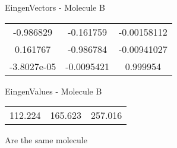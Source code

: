 \begin{multicols}{2}
\begin{center}
\vtab
 EingenVectors - Molecule B     \\
\vtab
\begin{tabular}{|c c c|}
-0.986829	 & 	-0.161759	 & 	-0.00158112	 \\
0.161767	 & 	-0.986784	 & 	-0.00941027	 \\
-3.8027e-05	 & 	-0.0095421	 & 	0.999954
\end{tabular}

\vtab
 EingenValues - Molecule B     \\
\vtab
\begin{tabular}{|c c c|}
112.224	 & 	165.623	 & 	257.016
\end{tabular}

\end{center}
\end{multicols}
\begin{center}
\vtab
\vtab
\textcolor{NavyBlue}{\Large Are the same molecule}
\end{center}
\newpage


